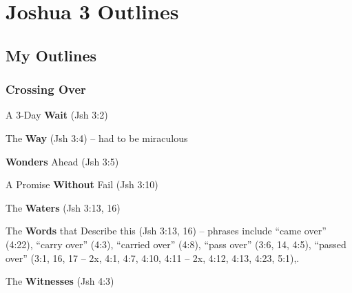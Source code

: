 \section{Joshua 3 Outlines}

\subsection{My Outlines}

\subsubsection{Crossing Over}
\begin{compactenum}[I.]
    \item A 3-Day \textbf{Wait} (Jsh 3:2) 
    \item The \textbf{Way} (Jsh 3:4) -- had to be miraculous
    \item \textbf{Wonders} Ahead (Jsh 3:5) 
    \item A Promise  \textbf{Without} Fail (Jsh 3:10) 
    \item The  \textbf{Waters}     (Jsh 3:13, 16) 
    \item The  \textbf{Words} that Describe this     (Jsh 3:13, 16) -- phrases include ``came over'' (4:22), ``carry over'' (4:3), ``carried over'' (4:8), ``pass over'' (3:6, 14, 4:5), ``passed over'' (3:1, 16, 17 -- 2x, 4:1, 4:7, 4:10, 4:11 -- 2x, 4:12, 4:13, 4:23, 5:1),.
   \item The  \textbf{Witnesses}     (Jsh 4:3) 
\end{compactenum}